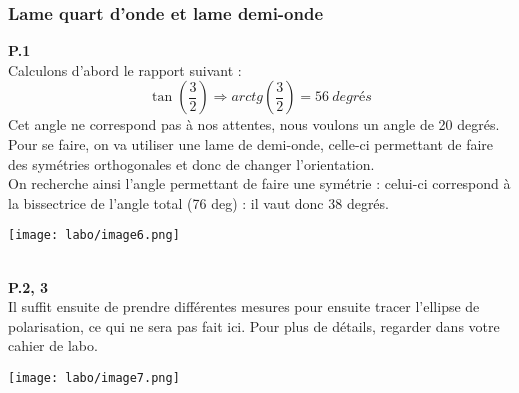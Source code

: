 \documentclass[british,french,11pt, a4paper, openany]{book}
\begin{document}
		\subsubsection*{Lame quart d'onde et lame demi-onde}
		\textbf{P.1}\\
		Calculons d'abord le rapport suivant : 
		\begin{equation}
			\tan\left(\frac{3}{2}\right) \Rightarrow arctg\left(\frac{3}{2}\right) = 56\ degrés
		\end{equation}
		Cet angle ne correspond pas à nos attentes, nous voulons un angle de 20 degrés. Pour se faire, on va utiliser une lame de demi-onde, celle-ci permettant de faire des symétries orthogonales et donc de changer l'orientation.\\
		On recherche ainsi l'angle permettant de faire une symétrie : celui-ci correspond à la bissectrice de l'angle total (76 deg) : il vaut donc 38 degrés.
		\begin{center}
			\texttt{[image: labo/image6.png]}
		\end{center}
		\ \\
		
		\textbf{P.2, 3}\\
		Il suffit ensuite de prendre différentes mesures pour ensuite tracer l'ellipse de polarisation, ce qui ne sera pas fait ici. Pour plus de détails, regarder dans votre cahier de labo.
		\begin{center}
			\texttt{[image: labo/image7.png]}
		\end{center}
		
		
		
		
		
		
		
		
		
		
		
		
		
		
		
		
		
		
		
		
		
		
		
		
		
		
		
		
		
		
		
		
		
		
		
		
		
		
		
\end{document}
